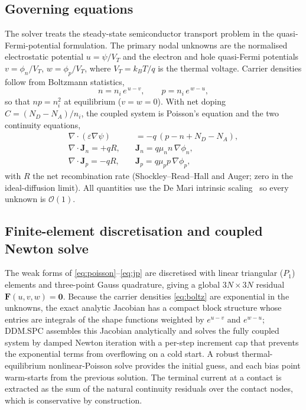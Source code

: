 \documentclass[10pt,journal]{IEEEtran}
\begin{document}
\subsection{Governing equations}
The solver treats the steady-state semiconductor transport problem in the
quasi-Fermi-potential formulation. The primary nodal unknowns are the normalised
electrostatic potential $u=\psi/V_T$ and the electron and hole quasi-Fermi
potentials $v=\phi_n/V_T$, $w=\phi_p/V_T$, where $V_T=k_BT/q$ is the thermal
voltage. Carrier densities follow from Boltzmann statistics,
\begin{equation}
  n = n_i\,e^{\,u-v}, \qquad p = n_i\,e^{\,w-u},
  \label{eq:boltz}
\end{equation}
so that $np=n_i^2$ at equilibrium ($v=w=0$). With net doping
$C=(N_D-N_A)/n_i$, the coupled system is Poisson's equation and the two
continuity equations,
\begin{align}
  \nabla\!\cdot(\varepsilon\nabla\psi) &= -q\,(p-n+N_D-N_A), \label{eq:poisson}\\
  \nabla\!\cdot\mathbf{J}_n = +qR,\quad & \mathbf{J}_n = q\mu_n n\,\nabla\phi_n, \label{eq:jn}\\
  \nabla\!\cdot\mathbf{J}_p = -qR,\quad & \mathbf{J}_p = q\mu_p p\,\nabla\phi_p, \label{eq:jp}
\end{align}
with $R$ the net recombination rate (Shockley--Read--Hall and Auger; zero in the
ideal-diffusion limit). All quantities use the De Mari intrinsic
scaling~\cite{demari1968} so every unknown is $\mathcal{O}(1)$.

\subsection{Finite-element discretisation and coupled Newton solve}
The weak forms of \eqref{eq:poisson}--\eqref{eq:jp} are discretised with linear
triangular ($P_1$) elements and three-point Gauss quadrature, giving a global
$3N\times 3N$ residual $\mathbf{F}(u,v,w)=\mathbf{0}$. Because the carrier
densities \eqref{eq:boltz} are exponential in the unknowns, the exact analytic
Jacobian has a compact block structure whose entries are integrals of the shape
functions weighted by $e^{u-v}$ and $e^{w-u}$; DDM.SPC assembles this Jacobian
analytically and solves the fully coupled system by damped Newton iteration with
a per-step increment cap that prevents the exponential terms from overflowing on
a cold start. A robust thermal-equilibrium nonlinear-Poisson solve provides the
initial guess, and each bias point warm-starts from the previous solution. The
terminal current at a contact is extracted as the sum of the natural continuity
residuals over the contact nodes, which is conservative by construction.
\end{document}
